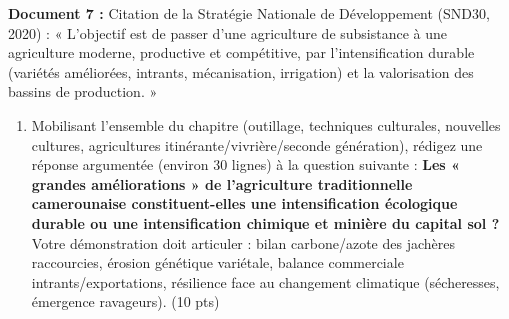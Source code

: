 \documentclass[11pt]{article}
\begin{document}
\begin{exercice}
\textbf{Document 7 :} Citation de la Stratégie Nationale de Développement (SND30, 2020) : « L'objectif est de passer d'une agriculture de subsistance à une agriculture moderne, productive et compétitive, par l'intensification durable (variétés améliorées, intrants, mécanisation, irrigation) et la valorisation des bassins de production. »

\begin{enumerate}
    \item Mobilisant l'ensemble du chapitre (outillage, techniques culturales, nouvelles cultures, agricultures itinérante/vivrière/seconde génération), rédigez une réponse argumentée (environ 30 lignes) à la question suivante : \textbf{Les « grandes améliorations » de l'agriculture traditionnelle camerounaise constituent-elles une intensification écologique durable ou une intensification chimique et minière du capital sol ?} Votre démonstration doit articuler : bilan carbone/azote des jachères raccourcies, érosion génétique variétale, balance commerciale intrants/exportations, résilience face au changement climatique (sécheresses, émergence ravageurs). \hfill (10 pts)
\end{enumerate}
\end{exercice}
\end{document}
